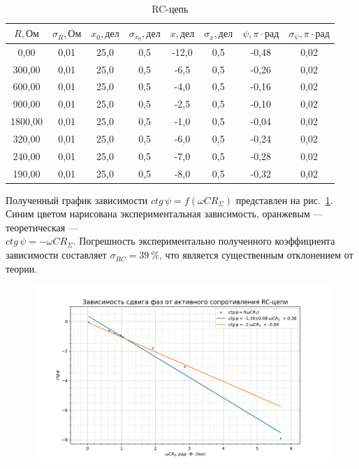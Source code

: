 \documentclass[a4paper, 12pt]{article}
\begin{document}
\begin{table}[h!]
\begin{center}
\begin{tabular}{|c|c|c|c|c|c|c|c|}
\hline
$R, Ом$   & $\sigma_R, Ом$ & $x_0, дел$ & $\sigma_{x_0}, дел$ & $x, дел$ & $\sigma_x, дел$ & $\psi, \pi \cdot рад$ & $\sigma_{\psi}, \pi \cdot рад$ \\ \hline
0,00    & 0,01   & 25,0    & 0,5      & -12,0  & 0,5     & -0,48       & 0,02        \\ \hline
300,00  & 0,01   & 25,0    & 0,5      & -6,5   & 0,5     & -0,26       & 0,02        \\ \hline
600,00  & 0,01   & 25,0    & 0,5      & -4,0   & 0,5     & -0,16       & 0,02        \\ \hline
900,00  & 0,01   & 25,0    & 0,5      & -2,5   & 0,5     & -0,10       & 0,02        \\ \hline
1800,00 & 0,01   & 25,0    & 0,5      & -1,0   & 0,5     & -0,04       & 0,02        \\ \hline
320,00  & 0,01   & 25,0    & 0,5      & -6,0   & 0,5     & -0,24       & 0,02        \\ \hline
240,00  & 0,01   & 25,0    & 0,5      & -7,0   & 0,5     & -0,28       & 0,02        \\ \hline
190,00  & 0,01   & 25,0    & 0,5      & -8,0   & 0,5     & -0,32       & 0,02        \\ \hline
\end{tabular}
\end{center}
\caption{RC-цепь}
\label{tab1}
\end{table}

Полученный график зависимости $ctg\,\psi = f(\omega CR_{\Sigma})$ представлен на рис.~\ref{ris1}. Синим цветом нарисована экспериментальная зависимость, оранжевым --- теоретическая --- \\ $ctg\,\psi = - \omega CR_{\Sigma}$. Погрешность экспериментально полученного коэффициента зависимости составляет $\sigma_{RC} = 39~\%$, что является существенным отклонением от теории.

\begin{figure}[h!]
\begin{flushleft}
    \includegraphics[scale=0.7]{3.2.1_1.png}
\end{flushleft}
\caption{}
\label{ris1}
\end{figure}
\end{document}
